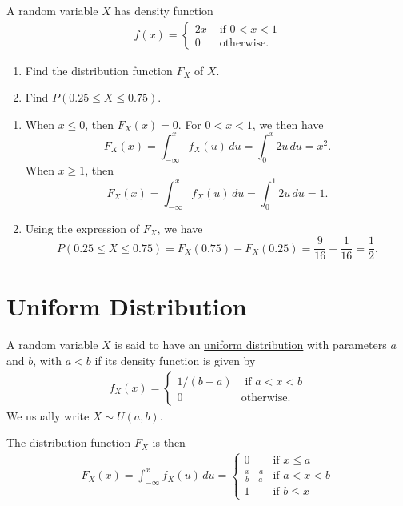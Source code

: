 \begin{example}
A random variable $X$ has density function
    \begin{align*}
    f (x) = \left\{ \begin{matrix} 2x & \text{ if } 0 < x < 1 \\ 0 & \text{ otherwise.} \end{matrix} \right.
    \end{align*}
    \begin{enumerate}[label=\alph*)]
        \item Find the distribution function $F_X$ of $X$.
        \item Find $P (0.25 \leq X \leq 0.75)$.
    \end{enumerate}
\end{example}
\begin{sol*}
    \begin{enumerate}[label=\alph*)]
        \item When $x \leq 0$, then $F_X (x) = 0$. For $0 < x < 1$, we then have
        \[
            F_X (x) = \int_{-\infty}^x f_X (u) \, du = \int_0^x 2u \, du = x^2 .
        \]
        When $x \geq 1$, then
        \[
            F_X (x) = \int_{-\infty}^x f_X (u) \, du = \int_0^1 2u \, du = 1 .
        \]
        \item Using the expression of $F_X$, we have
        \[
            P (0.25 \leq X \leq 0.75 ) = F_X (0.75) - F_X (0.25) = \frac{9}{16} - \frac{1}{16} = \frac{1}{2} . \tag*{$\triangle$}
        \]
    \end{enumerate}
\end{sol*}

\section{Uniform Distribution}

A random variable $X$ is said to have an \underline{uniform distribution} with parameters $a$ and $b$, with $a < b$ if its density function is given by
    \begin{align*}
    f_X (x) = \left\{ \begin{matrix} 1/(b-a) & \text{ if } a < x < b \\ 0 & \text{otherwise.} \end{matrix} \right. 
    \end{align*}
We usually write $X \sim U (a, b)$.

The distribution function $F_X$ is then
    \begin{align*}
    F_X (x) = \int_{-\infty}^x f_X (u) \, du = \left\{ \begin{matrix} 0 & \text{if } x \leq a \\ \frac{x - a}{b - a} & \text{if } a < x < b \\ 1 & \text{if } b \leq x \end{matrix} \right. 
    \end{align*}

